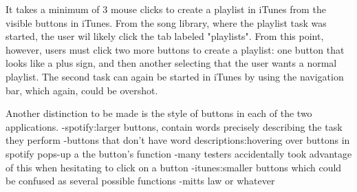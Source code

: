\documentclass[12pt]{report}
\begin{document}
It takes a minimum of 3 mouse clicks to create a playlist in iTunes from the visible buttons in iTunes. From the song library, where the playlist task was started, the user wil likely click the tab labeled "playlists". From this point, however, users must click two more buttons to create a playlist: one button that looks like a plus sign, and then another selecting that the user wants a normal playlist. The second task can again be started in iTunes by using the navigation bar, which again, could be overshot.

Another distinction to be made is the style of buttons in each of the two applications.
-spotify:larger buttons, contain words precisely describing the task they perform
	-buttons that don't have word descriptions:hovering over buttons in spotify pops-up a the button's function
	-many testers accidentally took advantage of this when hesitating to click on a button
-itunes:smaller buttons which could be confused as several possible functions
-mitts law or whatever
\end{document}
